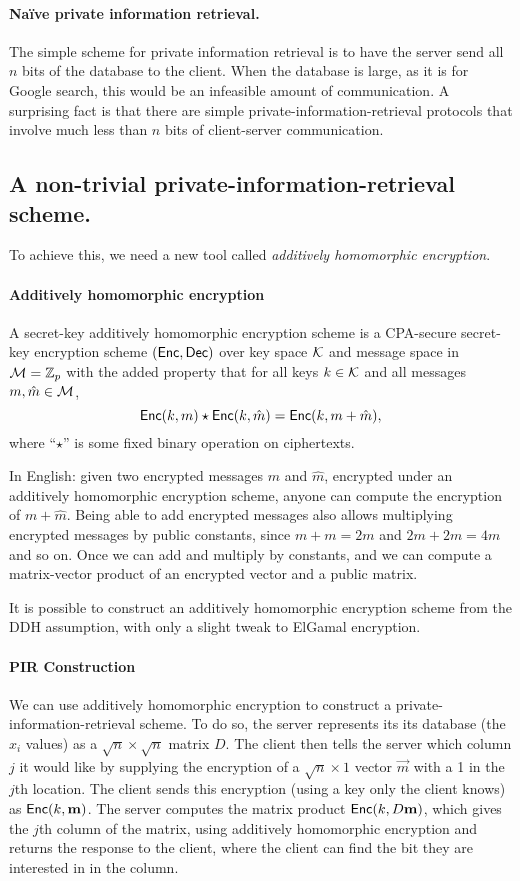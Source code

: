 \paragraph{Na\"ive private information retrieval.}
The simple scheme for private information retrieval
is to have the server send all $n$ bits of the database
to the client.
When the database is large, as it is for Google search,
this would be an infeasible amount of communication.
A surprising fact is that there are simple private-information-retrieval
protocols that involve much less than $n$ bits of client-server
communication.

\subsection{A non-trivial private-information-retrieval scheme.}
To achieve this, we need a new tool called
\emph{additively homomorphic encryption}.

\paragraph{Additively homomorphic encryption}
A secret-key additively homomorphic encryption scheme is
a CPA-secure secret-key encryption scheme $(\mathsf{Enc},
\mathsf{Dec})$ over key space $\mathcal{K}$ and 
message space in $\mathcal{M} = \mathbb{Z}_p$ with the
added property that for all keys $k \in \mathcal{K}$
and all messages $m, \hat{m} \in \mathcal{M}$,
\[ \mathsf{Enc}(k, m) \star \mathsf{Enc}(k, \hat{m}) = \mathsf{Enc}(k, m + \hat{m}), \]
where ``$\star$'' is some fixed binary operation on ciphertexts.

In English: given two encrypted messages $m$ and $\hat m$,
encrypted under an additively homomorphic encryption scheme,
anyone can compute the encryption of $m + \hat m$.
Being able to add encrypted messages also allows multiplying
encrypted messages by public constants, since $m + m = 2m$
and $2m + 2m = 4m$ and so on.
Once we can add and multiply by constants, and
we can compute a matrix-vector product of an
encrypted vector and a public matrix.

It is possible to construct an additively
homomorphic encryption scheme from the DDH
assumption, with only a slight tweak to ElGamal
encryption.

\paragraph{PIR Construction}
We can use additively homomorphic encryption
to construct a private-information-retrieval scheme.
To do so, the server represents its
its database (the $x_i$ values) as a $\sqrt{n}
\times \sqrt{n}$ matrix $D$. The client then tells
the server which column $j$ it would like by
supplying the encryption of a $\sqrt{n} \times 1$
vector $\vec{m}$ with a 1 in the $j$th location.
The client sends this encryption (using a key only
the client knows) as $\mathsf{Enc}(k, \mathbf{m})$. The
server computes the matrix product $\mathsf{Enc}(k,
D\mathbf{m})$, which gives the $j$th column of the
matrix, using additively homomorphic encryption
and returns the response to the client, where the
client can find the bit they are interested in in
the column. 

